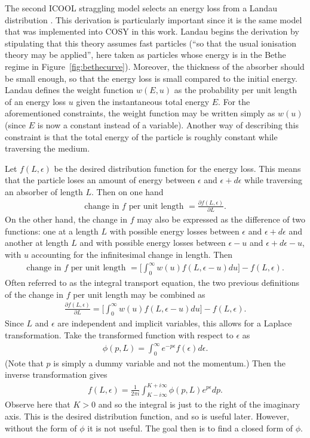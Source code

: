 The second ICOOL straggling model selects an energy loss from a Landau distribution \cite{landau}. This derivation is particularly important since it is the same model that was implemented into COSY in this work. Landau begins the derivation by stipulating that this theory assumes fast particles (``so that the usual ionisation theory may be applied'', here taken as particles whose energy is in the Bethe regime in Figure~\ref{fig:bethecurve}). Moreover, the thickness of the absorber should be small enough, so that the energy loss is small compared to the initial energy. Landau defines the weight function $w(E,u)$ as the probability per unit length of an energy loss $u$ given the instantaneous total energy $E$. For the aforementioned constraints, the weight function may be written simply as $w(u)$ (since $E$ is now a constant instead of a variable). Another way of describing this constraint is that the total energy of the particle is roughly constant while traversing the medium.

Let $f(L,\epsilon)$ be the desired distribution function for the energy loss. This means that the particle loses an amount of energy between $\epsilon$ and $\epsilon+d\epsilon$ while traversing an absorber of length $L$. Then on one hand
\begin{align*}
\text{change in $f$ per unit length }=\frac{\partial f(L,\epsilon)}{\partial L}.
\end{align*}
On the other hand, the change in $f$ may also be expressed as the difference of two functions: one at a length $L$ with possible energy losses between $\epsilon$ and $\epsilon+d\epsilon$ and another at length $L$ and with possible energy losses between $\epsilon-u$ and $\epsilon+d\epsilon-u$, with $u$ accounting for the infinitesimal change in length. Then
\begin{align*}
\text{change in $f$ per unit length }=\Bigg [\int_0 ^\infty w(u) f(L,\epsilon-u) du \Bigg] - f(L,\epsilon).
\end{align*}
Often referred to as the integral transport equation, the two previous definitions of the change in $f$ per unit length may be combined as
\begin{align}\label{eqn:Landau1}
\frac{\partial f(L,\epsilon)}{\partial L} = \Bigg [\int_0 ^\infty w(u) f(L,\epsilon-u) du \Bigg] - f(L,\epsilon).
\end{align}
Since $L$ and $\epsilon$ are independent and implicit variables, this allows for a Laplace transformation. Take the transformed function with respect to $\epsilon$ as 
\begin{align*}
\phi(p,L)=\int_0 ^\infty e^{-p \epsilon} f(\epsilon) d\epsilon.
\end{align*}
(Note that $p$ is simply a dummy variable and not the momentum.)
%
Then the inverse transformation gives
\begin{align} \label{eqn:LandauInverseTransformation}
f(L,\epsilon)=\frac{1}{2\pi i} \int_{K-i \infty} ^{K+i\infty} \phi(p,L) e^{p\epsilon} dp.
\end{align}
Observe here that $K>0$ and so the integral is just to the right of the imaginary axis. This is the desired distribution function, and so is useful later. However, without the form of $\phi$ it is not useful. The goal then is to find a closed form of $\phi$.

